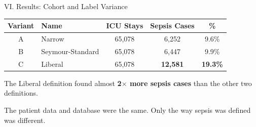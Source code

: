 \begin{frame}{VI. Results: Cohort and Label Variance}
\begin{center}\tablestyle
\begin{tabular}{clccc}
\toprule
\textbf{Variant} & \textbf{Name} & \textbf{ICU Stays}
  & \textbf{Sepsis Cases} & \textbf{\%} \\
\midrule
A & Narrow           & 65,078 & 6,252              & 9.6\% \\
B & Seymour-Standard & 65,078 & 6,447              & 9.9\% \\
C & Liberal          & 65,078 & \textbf{12,581}     & \textbf{19.3\%} \\
\bottomrule
\end{tabular}
\end{center}

\vspace{8pt}
The Liberal definition found almost \textbf{2$\times$ more sepsis cases}
than the other two definitions.

\vspace{4pt}
The patient data and database were the same. Only the way sepsis was defined
was different.
\end{frame}


